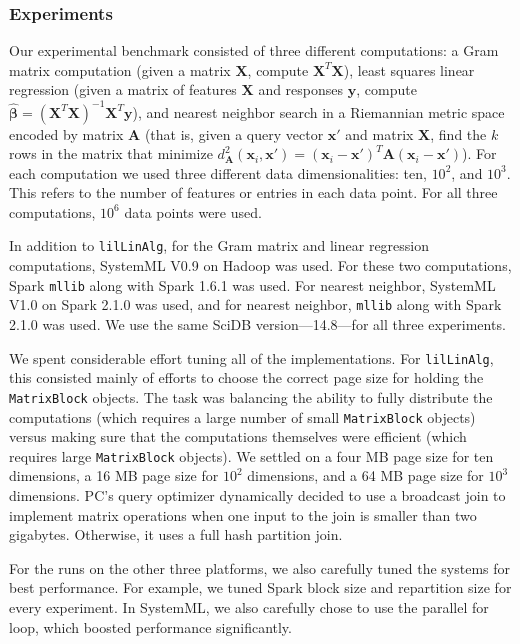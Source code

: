 \subsubsection {Experiments}

Our experimental benchmark consisted of three different computations:
a Gram matrix computation (given a matrix $\textbf{X}$, compute
$\textbf{X}^T \textbf{X}$), least squares linear regression (given a matrix of features $\textbf{X}$ and
responses $\textbf{y}$, compute 
$\hat{\pmb{\beta}} = (\textbf{X}^{T} \textbf{X})^{-1} \textbf{X}^{T} \textbf{y}$), and nearest
neighbor search in a Riemannian metric space \cite{lebanon2006metric} encoded by matrix $\textbf{A}$ (that is,
given a query vector
$\textbf{x}'$ and matrix $\textbf{X}$, find the $k$ rows in the matrix that minimize 
$d_{\textbf{A}}^2(\textbf{x}_i, \textbf{x}') = 
(\textbf{x}_i - \textbf{x}')^T\textbf{A}(\textbf{x}_i - \textbf{x}')$).  
For each computation we used three different data dimensionalities: ten, $10^2$, and $10^3$.  This refers to
the number of features or entries in each data point. 
For
all three computations, 
$10^6$ data points were used. 

In addition to \texttt{lilLinAlg}, 
for the Gram matrix and linear regression computations, SystemML V0.9 on Hadoop was used.
For these two computations, Spark \texttt{mllib} along with
Spark 1.6.1 was used.  For
nearest neighbor, SystemML V1.0 on Spark 2.1.0 was used, and for
nearest neighbor, \texttt{mllib} along with Spark 2.1.0 was used. We
use the same SciDB version---14.8---for all three
experiments.

We spent considerable effort tuning all of the implementations.
For \texttt{lilLinAlg}, this consisted mainly of efforts to choose the correct page size for holding the
\texttt{MatrixBlock} objects.  The task was balancing the ability to fully distribute the computations
(which requires a large number of small \texttt{MatrixBlock} objects) versus making sure that the computations
themselves were efficient (which requires large \texttt{MatrixBlock} objects).  We settled on 
a four MB page size for ten dimensions, a 16 MB page
size for $10^2$ dimensions, and a 64 MB page size for $10^3$ dimensions. 
PC's query optimizer dynamically decided to use a
broadcast join to implement matrix operations when one input to the join is smaller than 
two
gigabytes.  Otherwise, it uses a full hash partition join.

For the runs on the other three platforms, we also carefully tuned the
systems for best performance. For example, we tuned Spark block size and repartition
size for every experiment. In SystemML, we also carefully chose to
use the parallel for loop, which boosted performance significantly.

